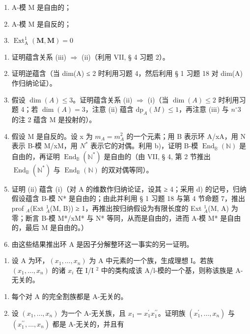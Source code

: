 \begin{enumerate}
\def\labelenumi{(\roman{enumi})}
\item
  A-模 M 是自由的；
\item
  A-模 M 是自反的；
\item
  \(\operatorname{Ext}_{\mathrm{A}}^{1}(\mathbf{M},\mathbf{M}) = 0\)
\end{enumerate}

\begin{enumerate}
\def\labelenumi{\alph{enumi})}
\item
  证明蕴含关系 (iii) \(\Rightarrow\) (ii)（利用 VII, § 4 习题 2）。
\item
  证明逆蕴含（当 dim(A) ≤ 2 时利用习题 4，然后利用 § 1 习题 18 对 dim(A) 作归纳论证）。
\item
  假设 \(\dim(A) \leqslant 3\)。证明蕴含关系 (ii) \(\Rightarrow\) (i)（当 \(\dim(A) \leqslant 2\) 时利用习题 4；若 \(\dim(A) = 3\)，注意 (ii) 蕴含 \(\mathrm{dp}_{A}(M) \leqslant 1\)，再注意 (iii) 与 \(n^{\circ} 3\) 的注 2 蕴含 M 是投射的）。
\item
  假设 M 是自反的。设 x 为 \(m_{A} = m_{A}^{2}\) 的一个元素；用 B 表示环 A/xA，用 N 表示 B-模 M/xM，用 \(N^{*}\) 表示它的对偶。利用 b)，证明 B-模 \(\operatorname{End}_{\mathbb{B}}(\mathbb{N})\) 是自由的，再证明 \(\operatorname{End}_{\mathbb{B}}(\mathbb{N}^{*})\) 是自由的（由 VII, § 4, 第 2 节推出 \(\operatorname{End}_{\mathbb{B}}(\mathbb{N}^{*})\) 与 \(\operatorname{End}_{\mathbb{B}}(\mathbb{N})\) 的双对偶等同）。
\item
  证明 (ii) 蕴含 (i)（对 A 的维数作归纳论证，设其 ≥ 4；采用 d) 的记号，归纳假设蕴含 B-模 N* 是自由的；由此并利用 § 1 习题 18 与第 4 节命题 7，推出 prof \(_{A}\)(Ext \(^{1}_{A}\)(M, B)) ≥ 1，再推出按归纳假设为有限长度的 Ext \(^{1}_{A}\)(M, A) 为零；断言 B-模 M*/xM* 与 N* 等同，从而是自由的，进而 A-模 M* 是自由的，最后 M 是自由的。）
\item
  由这些结果推出环 A 是因子分解整环这一事实的另一证明。
\end{enumerate}

\begin{enumerate}
\def\labelenumi{\arabic{enumi})}
\setcounter{enumi}{11}
\tightlist
\item
  设 A 为环，\((x_{1},\ldots,x_{n})\) 为 A 中元素的一个族，生成理想 I。若族 \((x_{1},\ldots,x_{n})\) 的诸 \(x_{i}\) 在 I/I \(^{2}\) 中的类构成该 A/l-模的一个基，则称该族是 A-无关的。
\end{enumerate}

\begin{enumerate}
\def\labelenumi{\alph{enumi})}
\item
  每个对 A 的完全割族都是 A-无关的。
\item
  设 \((x_{1},\ldots,x_{n})\) 为一个 A-无关族，且 \(x_{1}=x_{1}^{\prime}x_{1}^{\prime\prime}\)。证明族 \((x_{1}^{\prime},\ldots,x_{n})\) 与 \((x_{1}^{\prime\prime},\ldots,x_{n})\) 都是 A-无关的，并且有
\end{enumerate}

